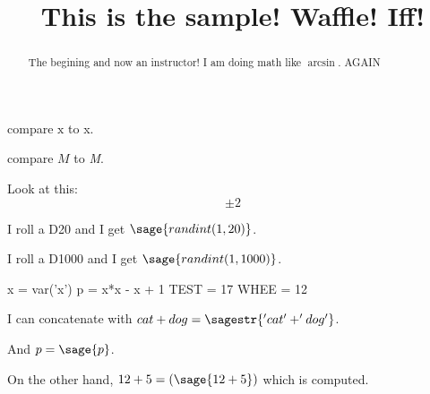 \documentclass{ximera}
\title[Breal-grond]{This is the sample! Waffle!  Iff!}
\makeatletter
\newcommand{\makerandom}{}
\newcommand{\makerandom}{%
  \ST@wsf{jobname="\currfilebase"}%
  \ST@wsf{import hashlib}%
  \ST@wsf{set_random_seed(int(hashlib.sha256(jobname.encode('utf-8')).hexdigest(), 16))}%
}
\makeatother
\begin{document}
\begin{abstract}
  The begining and now an instructor! I am doing math like $\arcsin$. AGAIN
\end{abstract}

\maketitle
\makerandom

compare $\mathrm{x}$ to x.

compare $M$ to \textit{M}.

Look at this:
\[
  \pm 2
\]

I roll a D20 and I get $\sage{randint(1,20)}$.

I roll a D1000 and I get $\sage{randint(1,1000)}$.


\begin{sagesilent}
  x = var('x')
  p = x*x - x + 1
  TEST = 17
  WHEE = 12
\end{sagesilent}

I can concatenate with $cat + dog = \sagestr{'cat' + 'dog'}$.

And $p = \sage{p}$.

On the other hand, $12 + 5 = \left( \sage{12+5} \right)$ which is computed.
\end{document}
